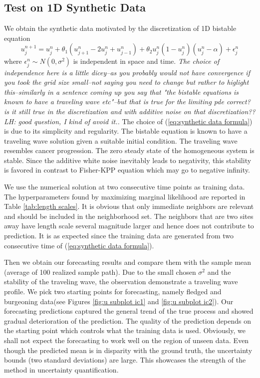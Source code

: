 \documentclass[smallextended,natbib]{svjour3}       %
\begin{document}
\subsection{Test on 1D Synthetic Data}
\label{sec:GP1d}
We obtain the synthetic data motivated by the discretization of 1D bistable equation
\begin{equation}
u_{j}^{n+1}=u_{j}^{n}+\theta_{1}(u_{j+1}^{n}-2u_{j}^{n}+u_{j-1}^{n})+\theta_{2}u_{j}^{n}(1-u_{j}^{n})(u_{j}^{n}-\alpha)+\epsilon_{j}^{n}\label{eq:synthetic data formula}
\end{equation}
where $\epsilon_{j}^{n}\sim N(0,\sigma^{2})$ is independent in space and time. \emph{The choice of independence here is a little dicey--as you probably would not have convergence if you took the grid size small--not saying you need to change but rather to higlight this--similarly in a sentence coming up you say that "the bistable equations is known to have a traveling wave etc"--but that is true for the limiting pde correct?  is it still true in the discretization and with additive noise on that discretization?? LH: good question, I kind of avoid it.. } The choice of (\ref{eq:synthetic data formula}) is due to its simplicity and regularity. The bistable equation is known to have a traveling wave solution given a suitable initial condition. The traveling wave resembles cancer progression. The zero steady state of the homogeneous system is stable. Since the additive white noise inevitably leads to negativity, this stability is favored in contrast to Fisher-KPP equation which may go to negative infinity.          

We use the numerical solution at two consecutive time points as training data. The hyperparameters found by maximizing marginal likelihood are reported in Table \ref{tab:length scales}. It is obvious that only immediate neighbors are relevant and should be included in the neighborhood set. The neighbors that are two sites away have length scale several magnitude larger and hence does not contribute to prediction. It is as expected since the training data are generated from two consecutive time of (\ref{eq:synthetic data formula}).     

Then we obtain our forecasting results and compare them with the sample mean (average of 100 realized sample path). Due to the small chosen $\sigma^2$ and the stability of the traveling wave, the observation demonstrate a traveling wave profile.  We pick two starting points for forecasting, namely fledged and burgeoning data(see Figures \ref{fig:u subplot ic1} and \ref{fig:u subplot ic2}). Our forecasting predictions captured the general trend of the true process and showed gradual deterioration of the prediction. The quality of the prediction depends on the starting point which controls what the training data is used. Obviously, we shall not expect the forecasting to work well on the region of unseen data. Even though the predicted mean is in disparity with the ground truth, the uncertainty bounds (two standard deviations) are large. This showcases the strength of the method in uncertainty quantification. 
\end{document}
